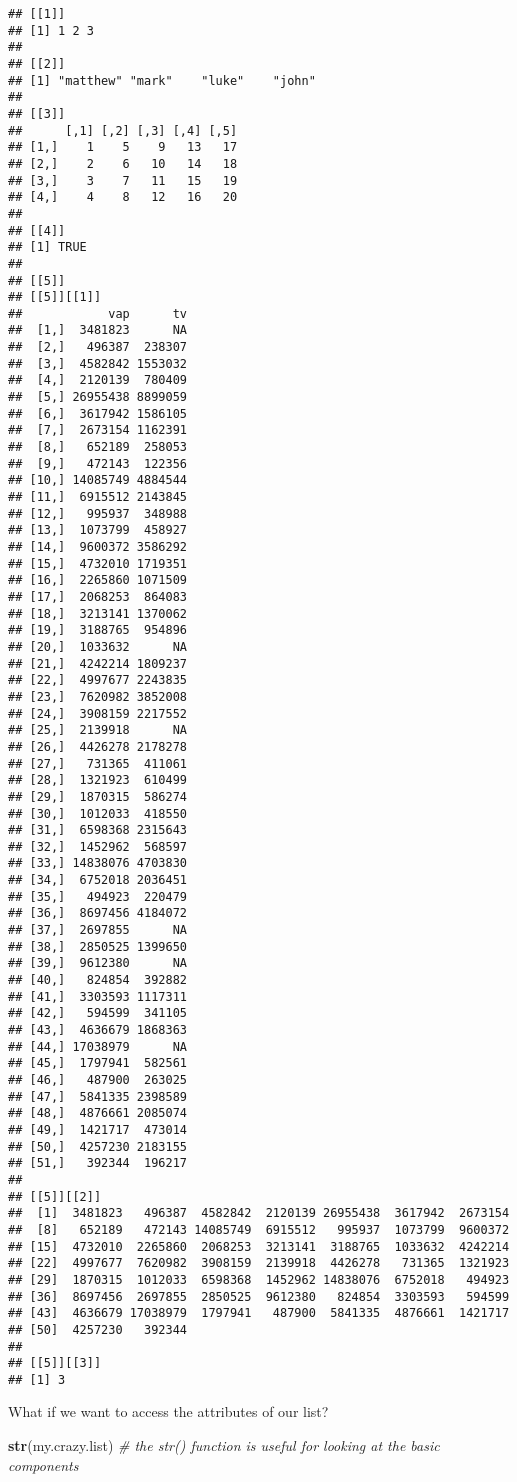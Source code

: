 \documentclass[]{article}
\newenvironment{Shaded}{\begin{snugshade}}{\end{snugshade}}
\newcommand{\KeywordTok}[1]{\textcolor[rgb]{0.13,0.29,0.53}{\textbf{#1}}}
\newcommand{\CommentTok}[1]{\textcolor[rgb]{0.56,0.35,0.01}{\textit{#1}}}
\newcommand{\NormalTok}[1]{#1}
\begin{document}
\begin{verbatim}
## [[1]]
## [1] 1 2 3
## 
## [[2]]
## [1] "matthew" "mark"    "luke"    "john"   
## 
## [[3]]
##      [,1] [,2] [,3] [,4] [,5]
## [1,]    1    5    9   13   17
## [2,]    2    6   10   14   18
## [3,]    3    7   11   15   19
## [4,]    4    8   12   16   20
## 
## [[4]]
## [1] TRUE
## 
## [[5]]
## [[5]][[1]]
##            vap      tv
##  [1,]  3481823      NA
##  [2,]   496387  238307
##  [3,]  4582842 1553032
##  [4,]  2120139  780409
##  [5,] 26955438 8899059
##  [6,]  3617942 1586105
##  [7,]  2673154 1162391
##  [8,]   652189  258053
##  [9,]   472143  122356
## [10,] 14085749 4884544
## [11,]  6915512 2143845
## [12,]   995937  348988
## [13,]  1073799  458927
## [14,]  9600372 3586292
## [15,]  4732010 1719351
## [16,]  2265860 1071509
## [17,]  2068253  864083
## [18,]  3213141 1370062
## [19,]  3188765  954896
## [20,]  1033632      NA
## [21,]  4242214 1809237
## [22,]  4997677 2243835
## [23,]  7620982 3852008
## [24,]  3908159 2217552
## [25,]  2139918      NA
## [26,]  4426278 2178278
## [27,]   731365  411061
## [28,]  1321923  610499
## [29,]  1870315  586274
## [30,]  1012033  418550
## [31,]  6598368 2315643
## [32,]  1452962  568597
## [33,] 14838076 4703830
## [34,]  6752018 2036451
## [35,]   494923  220479
## [36,]  8697456 4184072
## [37,]  2697855      NA
## [38,]  2850525 1399650
## [39,]  9612380      NA
## [40,]   824854  392882
## [41,]  3303593 1117311
## [42,]   594599  341105
## [43,]  4636679 1868363
## [44,] 17038979      NA
## [45,]  1797941  582561
## [46,]   487900  263025
## [47,]  5841335 2398589
## [48,]  4876661 2085074
## [49,]  1421717  473014
## [50,]  4257230 2183155
## [51,]   392344  196217
## 
## [[5]][[2]]
##  [1]  3481823   496387  4582842  2120139 26955438  3617942  2673154
##  [8]   652189   472143 14085749  6915512   995937  1073799  9600372
## [15]  4732010  2265860  2068253  3213141  3188765  1033632  4242214
## [22]  4997677  7620982  3908159  2139918  4426278   731365  1321923
## [29]  1870315  1012033  6598368  1452962 14838076  6752018   494923
## [36]  8697456  2697855  2850525  9612380   824854  3303593   594599
## [43]  4636679 17038979  1797941   487900  5841335  4876661  1421717
## [50]  4257230   392344
## 
## [[5]][[3]]
## [1] 3
\end{verbatim}

What if we want to access the attributes of our list?

\begin{Shaded}
\begin{Highlighting}[]
\KeywordTok{str}\NormalTok{(my.crazy.list) }\CommentTok{# the str() function is useful for looking at the basic components }
\end{Highlighting}
\end{Shaded}
\end{document}
